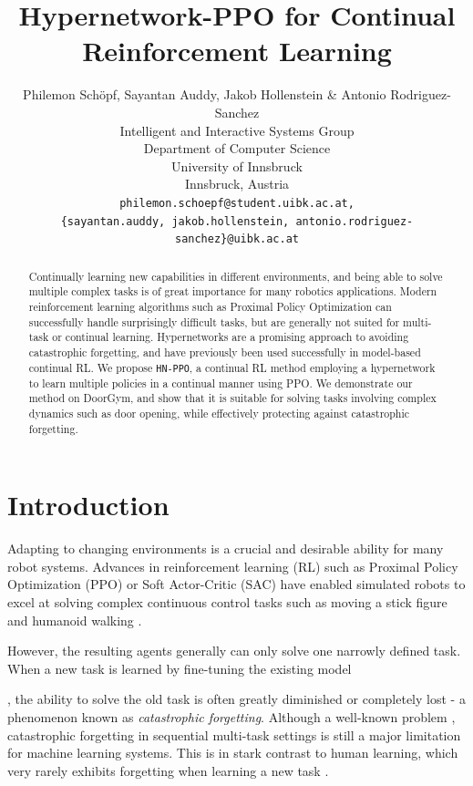 \documentclass[dvipsnames]{article} %
\title{Hypernetwork-PPO for Continual Reinforcement Learning}
\author{Philemon Schöpf, Sayantan Auddy, Jakob Hollenstein \& Antonio Rodriguez-Sanchez\\
Intelligent and Interactive Systems Group \\
Department of Computer Science\\
University of Innsbruck\\
Innsbruck, Austria \\
\texttt{philemon.schoepf@student.uibk.ac.at,} \\
\texttt{\{sayantan.auddy, jakob.hollenstein, antonio.rodriguez-sanchez\}@uibk.ac.at} \\
}
\newcommand{\comment}[1]{}
\newcommand{\sa}[1] {\comment{{\color{cyan} SA: #1}}}                %
\newcommand{\jh}[1] {\comment{{\color{RawSienna} JH: #1}}}           %
\newcommand{\as}[1] {\comment{{\color{orange} AS: #1}}}              %
\begin{document}
\maketitle
\sa{We need to think about the title. At present this is far too generic.}

\begin{abstract}
\jh{Recently someone mentioned the following structure for the abstract: 1/3 introduction, 1/3 problem, 1/3 solution.}
Continually learning new capabilities in different environments, and being able to solve multiple complex tasks is of great importance for many robotics applications. Modern reinforcement learning algorithms such as Proximal Policy Optimization can successfully handle surprisingly difficult tasks, but are generally not suited for multi-task or continual learning. Hypernetworks are a promising approach to avoiding catastrophic forgetting, and have previously been used successfully in model-based continual RL. We propose \texttt{HN-PPO}, a continual RL method employing a hypernetwork to learn multiple policies in a continual manner using PPO. We demonstrate our method on DoorGym, and show that it is suitable for solving tasks involving complex dynamics such as door opening, while effectively protecting against catastrophic forgetting. 
\end{abstract}


\section{Introduction}
\label{chap:intro}
Adapting to changing environments is a crucial and desirable ability for many robot systems. Advances in reinforcement learning (RL) such as Proximal Policy Optimization (PPO) \citep{ppo} or Soft Actor-Critic (SAC) \citep{sac} have enabled simulated robots to excel at solving complex continuous control tasks such as moving a stick figure and humanoid walking \citep{ppo}. 
\sa{PPO and SAC are both algorithms for continuous action spaces, while Atari games have a discrete action space. Change this to a suitable example.}
However, the resulting agents generally can only solve one narrowly defined task. When a new task is learned by fine-tuning the existing model 
\as{is "fine-tuning" the right word?, maybe"adjustment"?}\jh{I think fine-tuning is the right word, but fine-tuning is not very common in RL; I mean the continual-RL field is very young/small; So I think you should add a little bit of text that smooths the transition and explains that you want to extend or re-use the previously learned things. Maybe the problem is that here you basically introduce continual learning without mentioning continual learning.}
, the ability to solve the old task is often greatly diminished or completely lost - a phenomenon known as \textit{catastrophic forgetting}\sa{Cite the Parisi CL review paper}. Although a well-known problem \citep{MCCLOSKEY1989109}, catastrophic forgetting in sequential multi-task settings is still a major limitation for machine learning systems. This is in stark contrast to human learning, which very rarely exhibits forgetting when learning a new task \citep{parisiClReview}.
\end{document}

